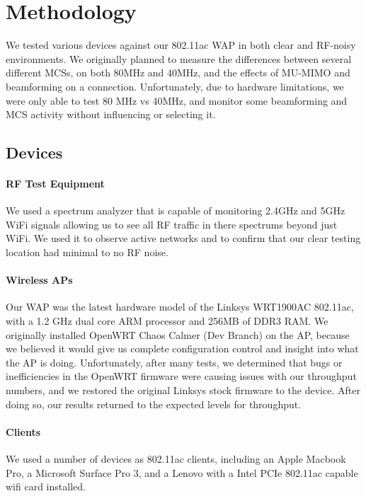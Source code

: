 \section{Methodology}

We tested various devices against our 802.11ac WAP in both clear and RF-noisy
environments. We originally planned to measure the differences between several
different MCSs, on both 80MHz and 40MHz, and the effects of MU-MIMO and
beamforming on a connection. Unfortunately, due to hardware limitations, we were
only able to test 80 MHz vs 40MHz, and monitor some beamforming and MCS activity
without influencing or selecting it.

\subsection{Devices}

\paragraph{RF Test Equipment}

We used a spectrum analyzer that is capable of monitoring 2.4GHz and 5GHz WiFi
signals allowing us to see all RF traffic in there spectrums beyond just WiFi.
We used it to observe active networks and to confirm that our clear testing
location had minimal to no RF noise.

\paragraph{Wireless APs}

Our WAP was the latest hardware model of the Linksys WRT1900AC 802.11ac,
with a 1.2 GHz dual core ARM processor and 256MB of DDR3 RAM. We originally
installed OpenWRT Chaos Calmer (Dev Branch) on the AP, because we believed it
would give us complete configuration control and insight into what the AP is
doing. Unfortunately, after many tests, we determined that bugs or
inefficiencies in the OpenWRT firmware were causing issues with our throughput
numbers, and we restored the original Linksys stock firmware to the device.
After doing so, our results returned to the expected levels for throughput.

\paragraph{Clients}

We used a number of devices as 802.11ac clients, including an Apple Macbook Pro,
a Microsoft Surface Pro 3, and a Lenovo  with a Intel  PCIe
802.11ac capable wifi card installed.

